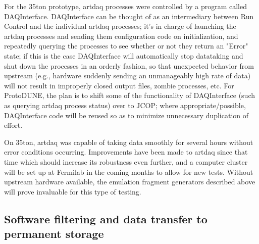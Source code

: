 For the 35ton prototype, artdaq processes were controlled by a program called
DAQInterface. DAQInterface can be thought of as an intermediary
between Run Control and the individual artdaq processes; it's in
charge of launching the artdaq processes and sending them
configuration code on initialization, and repeatedly querying the
processes to see whether or not they return an "Error" state; if this
is the case DAQInterface will automatically stop datataking and shut
down the processes in an orderly fashion, so that unexpected behavior
from upstream (e.g., hardware suddenly sending an unmanageably high
rate of data) will not result in improperly closed output files,
zombie processes, etc. For ProtoDUNE, the plan is to shift some of the functionality of DAQInterface (such as querying artdaq process status) over to JCOP;
 where appropriate/possible, DAQInterface code will be reused so as to minimize unnecessary duplication of effort. 

On 35ton, artdaq was capable of taking data smoothly for several hours
without error conditions occurring. 
Improvements have been made to
artdaq since that time which should increase its robustness even
further, and a computer cluster will be set up at Fermilab in the
coming months to allow for new tests. Without upstream hardware
available, the emulation fragment generators described above will
prove invaluable for this type of testing.




\subsection{Software filtering and data transfer to permanent storage}



